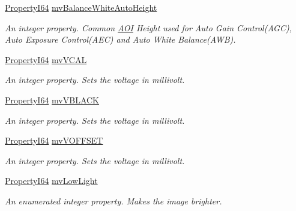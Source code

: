 \begin{DoxyCompactItemize}
\hyperlink{group___common_interface_ga81749b2696755513663492664a18a893}{Property\+I64} \hyperlink{classmv_i_m_p_a_c_t_1_1acquire_1_1_gen_i_cam_1_1_analog_control_a478acf3594e6d2f6de955d4397687454}{mv\+Balance\+White\+Auto\+Height}
\begin{DoxyCompactList}\small\item\em An integer property. Common \hyperlink{struct_a_o_i}{A\+O\+I} Height used for Auto Gain Control(\+A\+G\+C), Auto Exposure Control(\+A\+E\+C) and Auto White Balance(\+A\+W\+B). \end{DoxyCompactList}\item 
\hyperlink{group___common_interface_ga81749b2696755513663492664a18a893}{Property\+I64} \hyperlink{classmv_i_m_p_a_c_t_1_1acquire_1_1_gen_i_cam_1_1_analog_control_ab5cb092b98c165d578c4ba2f718a7d81}{mv\+V\+C\+A\+L}
\begin{DoxyCompactList}\small\item\em An integer property. Sets the voltage in millivolt. \end{DoxyCompactList}\item 
\hyperlink{group___common_interface_ga81749b2696755513663492664a18a893}{Property\+I64} \hyperlink{classmv_i_m_p_a_c_t_1_1acquire_1_1_gen_i_cam_1_1_analog_control_aeeae0380fafa45bbd7d62146f0cec7d4}{mv\+V\+B\+L\+A\+C\+K}
\begin{DoxyCompactList}\small\item\em An integer property. Sets the voltage in millivolt. \end{DoxyCompactList}\item 
\hyperlink{group___common_interface_ga81749b2696755513663492664a18a893}{Property\+I64} \hyperlink{classmv_i_m_p_a_c_t_1_1acquire_1_1_gen_i_cam_1_1_analog_control_a2021d735e61f95822e2479d920c6efbf}{mv\+V\+O\+F\+F\+S\+E\+T}
\begin{DoxyCompactList}\small\item\em An integer property. Sets the voltage in millivolt. \end{DoxyCompactList}\item 
\hyperlink{group___common_interface_ga81749b2696755513663492664a18a893}{Property\+I64} \hyperlink{classmv_i_m_p_a_c_t_1_1acquire_1_1_gen_i_cam_1_1_analog_control_a94f11c26e01efa4c8cb161d3ea82e80a}{mv\+Low\+Light}
\begin{DoxyCompactList}\small\item\em An enumerated integer property. Makes the image brighter. \end{DoxyCompactList}\item 

\end{DoxyCompactItemize}
